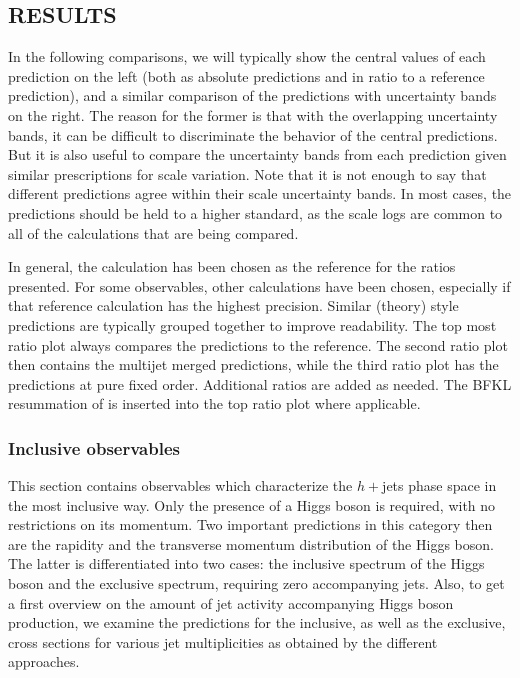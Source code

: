 \subsection{RESULTS}
\label{sec:hjetscomp:results}

In the following comparisons, we will typically show the central
values of each prediction on the left (both as absolute predictions
and in ratio to a reference prediction), and a similar comparison of
the predictions with uncertainty bands on the right. The reason for
the former is that with the overlapping uncertainty bands, it can be
difficult to discriminate the behavior of the central predictions. But
it is also useful to compare the uncertainty bands from each
prediction given similar prescriptions for scale variation.  Note that
it is not enough to say that different predictions agree within their
scale uncertainty bands. In most cases, the predictions should be held
to a higher standard, as the scale logs are common to all of the
calculations that are being compared.

In general, the \Powheg \NNLOPS calculation has been chosen as the 
reference for the ratios presented. For some observables, other calculations
have been chosen, especially if that reference calculation has the highest
precision. Similar (theory) style predictions are typically grouped together to improve readability. 
The top most 
ratio plot  always compares the \NNLOPS predictions to the reference. 
The second ratio plot then contains the multijet merged predictions, while 
the third ratio plot has the predictions at pure fixed order. Additional ratios are added as needed. The BFKL resummation 
of \Hej is inserted into the top ratio plot where applicable.



\subsubsection{Inclusive observables}
\label{sec:hjetscomp:results:inclobs}

This section contains observables which characterize the $h+{}$jets
phase space in the most inclusive way. Only the presence of a Higgs
boson is required, with no restrictions on its momentum. Two important
predictions in this category then are  the rapidity and the transverse momentum
distribution of the Higgs boson. The latter is differentiated into
two cases: the inclusive spectrum of the Higgs boson and the exclusive spectrum, requiring
zero  accompanying jets. Also, to get a first overview on the amount
of jet activity accompanying Higgs boson production, we examine the predictions for 
the inclusive,  as well as the exclusive,  cross sections for various jet
multiplicities as obtained by the different approaches.

